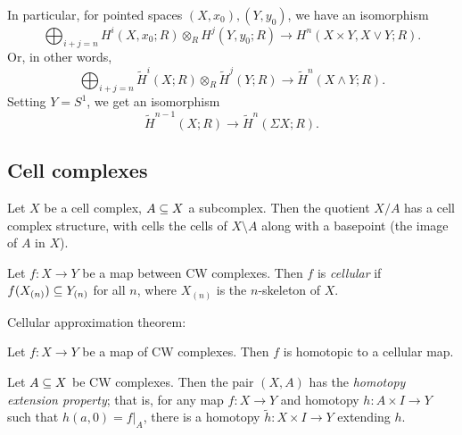 \documentclass{MetricNotes2023}
\def\subq{\ensuremath\subseteq}
\begin{document}
In particular, for pointed spaces \((X, x_0), (Y, y_0)\), we have an isomorphism
\[\bigoplus_{i+j=n} H^i(X, x_0; R)\otimes_R H^j(Y,y_0; R)\to H^n(X\times Y, X\vee Y; R).\]
Or, in other words,
\[\bigoplus_{i+j=n} \widetilde H^i(X; R)\otimes_R \widetilde H^j(Y; R)\to \widetilde H^n(X\wedge Y; R).\]
Setting \(Y=S^1\), we get an isomorphism
\[\widetilde H^{n-1}(X; R) \to \widetilde H^n(\Sigma X; R).\]

\subsection{Cell complexes}\label{2502141508}

\begin{definition}
Let \(X\) be a cell complex, \(A\subq X\) a subcomplex. Then the quotient \(X/A\) has a cell complex structure, with cells the cells of \(X\setminus A\) along with a basepoint (the image of \(A\) in \(X\)). 
\end{definition}

\begin{definition}
Let \(f : X \to Y\) be a map between CW complexes. Then \(f\) is \textit{cellular} if \(f(X_{(n)})\subq Y_{(n)}\) for all \(n\), where \(X_{(n)}\) is the \(n\)-skeleton of \(X\). 
\end{definition}

Cellular approximation theorem:

\begin{theorem}\label{2502211420}
Let \(f : X \to Y\) be a map of CW complexes. Then \(f\) is homotopic to a cellular map.
\end{theorem}

\begin{lemma}\label{2502211419}
Let \(A\subq X\) be CW complexes. Then the pair \((X, A)\) has the \textit{homotopy extension property}; that is, for any map \(f : X \to Y\) and homotopy \(h : A\times I \to Y\) such that \(h(a,0)=f|_A\), there is a homotopy \(\widetilde h : X\times I \to Y\) extending \(h\). 
\end{lemma}
\end{document}
